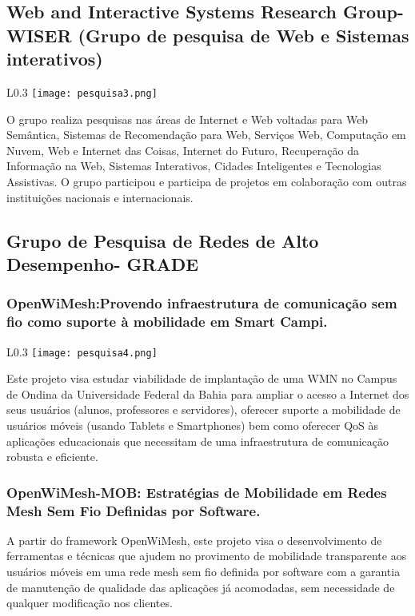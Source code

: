     \subsection{Web and Interactive Systems Research Group- WISER
    (Grupo de pesquisa de Web e Sistemas interativos)}
     \begin{wrapfigure}{L}{0.3\textwidth}
            \centering
            \texttt{[image: pesquisa3.png]}
        \end{wrapfigure}      
    O grupo realiza pesquisas nas áreas de Internet e Web voltadas para Web Semântica, Sistemas de Recomendação para Web, Serviços Web, Computação em Nuvem, Web e Internet das Coisas, Internet do Futuro, Recuperação da Informação na Web, Sistemas Interativos, Cidades Inteligentes e Tecnologias Assistivas. O grupo participou e participa de projetos em colaboração com outras instituições nacionais e internacionais.
     
     \subsection{Grupo de Pesquisa de Redes de Alto Desempenho- GRADE}
     \subsubsection*{OpenWiMesh:Provendo infraestrutura de comunicação sem fio como suporte à mobilidade em Smart Campi.}
      \begin{wrapfigure}{L}{0.3\textwidth}
            \centering
            \texttt{[image: pesquisa4.png]}
        \end{wrapfigure}      
     Este projeto visa estudar viabilidade de implantação de uma WMN no Campus de Ondina da Universidade Federal da Bahia para ampliar o acesso a Internet dos seus usuários (alunos, professores e servidores), oferecer suporte a mobilidade de usuários móveis (usando Tablets e Smartphones) bem como oferecer QoS às aplicações educacionais que necessitam de uma infraestrutura de comunicação robusta e eficiente. 
     \subsubsection*{OpenWiMesh-MOB: Estratégias de Mobilidade em Redes Mesh Sem Fio Definidas por Software.}
    A partir do framework OpenWiMesh, este projeto visa o desenvolvimento de ferramentas e técnicas que ajudem no provimento de mobilidade transparente aos usuários móveis em uma rede mesh sem fio definida por software com a garantia de manutenção de qualidade das aplicações já acomodadas, sem necessidade de qualquer modificação nos clientes.
    
